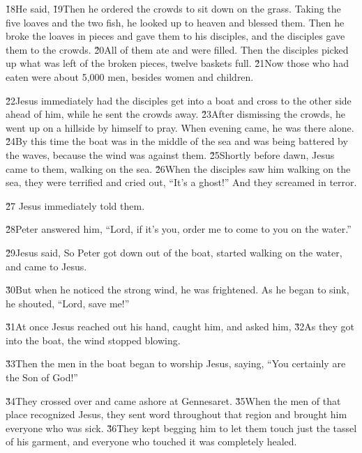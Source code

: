 \v{18}He said,  \v{19}Then he ordered the crowds to sit down on the grass. Taking the five loaves and the two fish, he looked up to heaven and blessed them. Then he broke the loaves in pieces and gave them to his disciples, and the disciples gave them to the crowds. \v{20}All of them ate and were filled. Then the disciples picked up what was left of the broken pieces, twelve baskets full. \v{21}Now those who had eaten were about 5,000 men, besides women and children.

\v{22}Jesus immediately had the disciples get into a boat and cross to the other side ahead of him, while he sent the crowds away. \v{23}After dismissing the crowds, he went up on a hillside by himself to pray. When evening came, he was there alone. \v{24}By this time the boat was in the middle of the sea and was being battered by the waves, because the wind was against them. \v{25}Shortly before dawn, Jesus came to them, walking on the sea. \v{26}When the disciples saw him walking on the sea, they were terrified and cried out, ``It's a ghost!'' And they screamed in terror.

\v{27} Jesus immediately told them. 

\v{28}Peter answered him, ``Lord, if it's you, order me to come to you on the water.''

\v{29}Jesus said,  So Peter got down out of the boat, started walking on the water, and came to Jesus.

\v{30}But when he noticed the strong wind, he was frightened. As he began to sink, he shouted, ``Lord, save me!''

\v{31}At once Jesus reached out his hand, caught him, and asked him,  \v{32}As they got into the boat, the wind stopped blowing.

\v{33}Then the men in the boat began to worship Jesus, saying, ``You certainly are the Son of God!''

\v{34}They crossed over and came ashore at Gennesaret. \v{35}When the men of that place recognized Jesus, they sent word throughout that region and brought him everyone who was sick. \v{36}They kept begging him to let them touch just the tassel of his garment, and everyone who touched it was completely healed.


